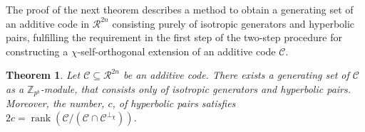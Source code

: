 \documentclass{article}
\DeclareMathOperator{\rank}{rank}
\newtheorem{thm}{Theorem}[section]
\theoremstyle{remark}
\theoremstyle{definition}
\numberwithin{equation}{section}
\begin{document}
The proof of the next theorem describes a method to obtain a generating set of an additive code in $\mathcal{R}^{2n}$ consisting purely of isotropic generators and hyperbolic pairs, fulfilling the requirement in the first step of the two-step procedure for constructing a $\chi$-self-orthogonal extension of an additive code $\mathcal{C}$.  

\begin{thm}\label{sym} Let $\mathcal{C} \subseteq \mathcal{R}^{2n}$ be an additive code. There exists a generating set of $\mathcal{C}$ as a $\mathbb{Z}_{p^b}$-module, that consists only of isotropic generators and hyperbolic pairs. Moreover, the number, $c$, of hyperbolic pairs satisfies $2c=\rank(\mathcal{C}/(\mathcal{C} \cap \mathcal{C}^{\perp_\chi}))$.
\end{thm}  
\end{document}
